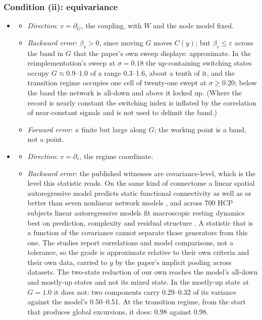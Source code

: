 \documentclass[11pt]{article}
\begin{document}
\subsubsection{Condition (ii): equivariance}
\begin{itemize}
\item[$\Theta_1$]
  \begin{itemize}
  \item \emph{Direction}: $v=\partial_G$, the coupling, with $W$ and the node model fixed.
  \item \emph{Backward error}: $\beta_v>0$, since moving $G$ moves $C(y)$; but $\beta_v\le\varepsilon$ across the band in $G$ that the paper's own sweep displays: approximate. In the reimplementation's sweep at $\sigma=0.18$ the up-containing switching states occupy $G\approx0.9$--$1.0$ of a range 0.3--1.6, about a tenth of it, and the transition regime occupies one cell of twenty-one swept at $\sigma\ge0.20$; below the band the network is all-down and above it locked up. (Where the record is nearly constant the switching index is inflated by the correlation of near-constant signals and is not used to delimit the band.)
  \item \emph{Forward error}: $\kappa$ finite but large along $G$; the working point is a band, not a point.
  \end{itemize}
\item[$\Theta_2$]
  \begin{itemize}
  \item \emph{Direction}: $v=\partial_r$, the regime coordinate.
  \item \emph{Backward error}: the published witnesses are covariance-level, which is the level this statistic reads. On the same kind of connectome a linear spatial autoregressive model predicts static functional connectivity as well as or better than seven nonlinear network models \parencite{messe2014,messe2015}, and across 700 HCP subjects linear autoregressive models fit macroscopic resting dynamics best on prediction, complexity and residual structure \parencite{nozari2024}. A statistic that is a function of the covariance cannot separate those generators from this one. The studies report correlations and model comparisons, not a tolerance, so the grade is approximate relative to their own criteria and their own data, carried to $y$ by the paper's implicit pooling across datasets. The two-state reduction of our own reaches the model's all-down and mostly-up states and not its mixed state. In the mostly-up state at $G=1.0$ it does not: two components carry 0.29--0.32 of its variance against the model's 0.50--0.51. At the transition regime, from the start that produces global excursions, it does: 0.98 against 0.98.

\end{itemize}
\end{itemize}
\end{document}
